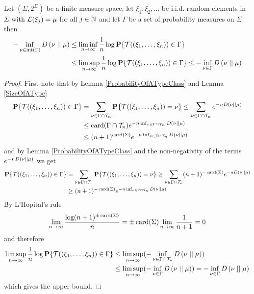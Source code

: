 \begin{thm}\label{SanovFiniteAlphabets}Let $(\Sigma, 2^\Sigma)$ be a finite measure space, let $\xi_1, \xi_2, \dotsc$ be i.i.d. random elements in $\Sigma$ with $\mathcal{L}(\xi_j) = \mu$ for all $j \in \mathbb{N}$ and let $\Gamma$ be a set of probability measures on $\Sigma$ then 
\begin{align*}
- \inf_{\nu \in \operatorname*{int}(\Gamma)} D\left( \nu \mid\mid \mu \right) 
&\leq \liminf_{n \to \infty} \frac{1}{n} \log \textbf{P}\{\mathcal{T}((\xi_1, \dotsc, \xi_n)) \in \Gamma\} \\
&\leq \limsup_{n \to \infty} \frac{1}{n} \log \textbf{P}\{\mathcal{T}((\xi_1, \dotsc, \xi_n)) \in \Gamma\} 
\leq - \inf_{\nu \in \Gamma} D\left( \nu \mid\mid \mu \right) \\
\end{align*}
\end{thm}
\begin{proof}
First note that by  Lemma \ref{ProbabilityOfATypeClass} and Lemma \ref{SizeOfAType}
\begin{align*}
\textbf{P}\{\mathcal{T}((\xi_1, \dotsc, \xi_n)) \in \Gamma\}
&= \sum_{\nu \in \Gamma \cap \mathcal{T}_{n}} \textbf{P}\{\mathcal{T}((\xi_1, \dotsc, \xi_n)) = \nu \}
\leq \sum_{\nu \in \Gamma \cap \mathcal{T}_{n}} e^{-n D\left( \nu \mid\mid \mu \right)} \\
&\leq \operatorname*{card}(\Gamma \cap \mathcal{T}_{n}) e^{-n \inf_{\nu \in \Gamma \cap \mathcal{T}_{n}} D\left( \nu \mid\mid \mu \right)} \\
&\leq (n+1)^{\operatorname*{card}(\Sigma)} e^{-n \inf_{\nu \in \Gamma \cap \mathcal{T}_{n}} D\left( \nu \mid\mid \mu \right)} \\
\end{align*}
and by  Lemma \ref{ProbabilityOfATypeClass} and the non-negativity of the terms $ e^{-n D\left( \nu \mid\mid \mu \right)}$
we get
\begin{align*}
\textbf{P}\{\mathcal{T}((\xi_1, \dotsc, \xi_n)) \in \Gamma\}
&= \sum_{\nu \in \Gamma \cap \mathcal{T}_{n}} \textbf{P}\{\mathcal{T}((\xi_1, \dotsc, \xi_n)) = \nu \}
\geq \sum_{\nu \in \Gamma \cap \mathcal{T}_{n}} (n+1)^{-\operatorname*{card}(\Sigma)} e^{-n D\left( \nu \mid\mid \mu \right)} \\
&\geq (n+1)^{-\operatorname*{card}(\Sigma)} e^{-n \inf_{\nu \in \Gamma \cap \mathcal{T}_{n}} D\left( \nu \mid\mid \mu \right)}
 \end{align*}
By L'Hopital's rule
\begin{align*}
\lim_{n \to \infty} \frac{\log (n+1)^{\pm\operatorname*{card}(\Sigma)}}{n} = \pm \operatorname*{card}(\Sigma) \lim_{n \to \infty} \frac{1}{n+1} =0
\end{align*}
and therefore
\begin{align*}
\limsup_{n \to \infty} \frac{1}{n} \log \textbf{P}\{\mathcal{T}((\xi_1, \dotsc, \xi_n)) \in \Gamma\} 
&\leq \limsup_{n \to \infty} (-\inf_{\nu \in \Gamma \cap \mathcal{T}_{n}} D\left( \nu \mid\mid \mu \right)) \\
&\leq \limsup_{n \to \infty} (-\inf_{\nu \in \Gamma} D\left( \nu \mid\mid \mu \right))
=-\inf_{\nu \in \Gamma} D\left( \nu \mid\mid \mu \right)
\end{align*}
which gives the upper bound.


\end{proof}
